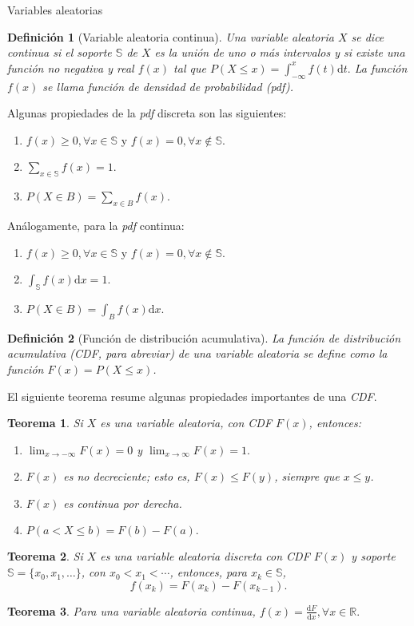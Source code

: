 \documentclass{beamer}
\newtheorem{defi}{Definición}[section]
\newtheorem{theo}{Teorema}[section]
\begin{document}
\begin{frame}[allowframebreaks]{Variables aleatorias}
	\begin{defi}[Variable aleatoria continua]
		Una variable aleatoria $X$ se dice continua si el soporte $\mathbb{S}$ de $X$ es la unión de uno o más intervalos y si existe una función no negativa y real $f(x)$ tal que $P(X\leq x)=\int_{-\infty}^x f(t)\mathrm{d}t.$ La función $f(x)$ se llama función de densidad de probabilidad (pdf).
	\end{defi}
	\vspace{2cm}
	Algunas propiedades de la \textit{pdf} discreta son las siguientes:
	\begin{enumerate}
		\item $f(x)\geq0, \forall x\in\mathbb{S}$ y $f(x)=0,\forall x\not\in \mathbb{S}$.
		\item $\sum_{x\in\mathbb{S}}f(x)=1$.
		\item $P(X\in B)=\sum_{x\in B} f(x).$
	\end{enumerate}
	Análogamente, para la \textit{pdf} continua:
	\begin{enumerate}
		\item $f(x)\geq0, \forall x\in\mathbb{S}$ y $f(x)=0,\forall x\not\in \mathbb{S}$.
		\item $\int_{\mathbb{S}}f(x)\mathrm{d}x=1$.
		\item $P(X\in B)=\int_{B}f(x)\mathrm{d}x.$
	\end{enumerate}
	\begin{defi}[Función de distribución acumulativa]
		La función de distribución acumulativa (CDF, para abreviar) de una variable aleatoria se define como la función $F(x)=P(X\leq x)$.
	\end{defi}
	El siguiente teorema resume algunas propiedades importantes de una \textit{CDF}. 
	
	\begin{theo}
		Si $X$ es una variable aleatoria, con \textit{CDF} $F(x)$, entonces:
		\begin{enumerate}
			\item $\lim_{x\rightarrow-\infty}F(x)=0$ y $\lim_{x\rightarrow\infty} F(x)=1.$
			\item $F(x)$ es no decreciente; esto es, $F(x)\leq F(y)$, siempre que $x\leq y$.
			\item $F(x)$ es continua por derecha.
			\item $P(a< X \leq b)=F(b)-F(a).$
		\end{enumerate}
	\end{theo}
	
		\begin{theo}
		Si $X$ es una variable aleatoria discreta con \textit{CDF} $F(x)$ y soporte $\mathbb{S}=\{x_0,x_1,\dots\}$, con $x_0<x_1<\cdots$, entonces, para $x_k\in\mathbb{S}$,
		$$f(x_k)=F(x_k)-F(x_{k-1}).$$
	\end{theo}
	
	\begin{theo}
		Para una variable aleatoria continua, $f(x)=\frac{\mathrm{d}F}{\mathrm{d}x}, \forall x\in\mathbb{R}.$
	\end{theo}
	\end{frame}
\end{document}
